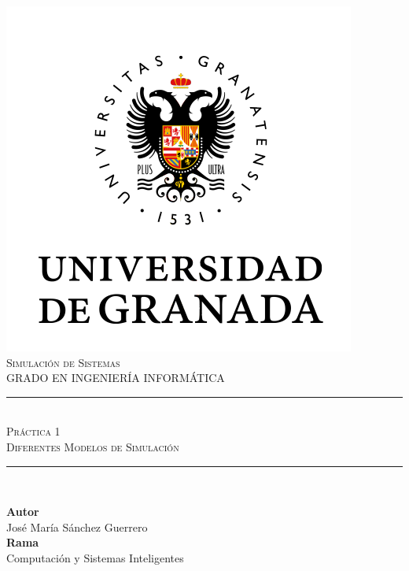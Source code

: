 \documentclass[11pt,a4paper]{report}
\newcommand{\asignatura}{Simulación de Sistemas}
\newcommand{\autor}{José María Sánchez Guerrero}
\newcommand{\titulo}{Práctica 1}
\newcommand{\subtitulo}{Diferentes Modelos de Simulación}
\begin{document}

\begin{titlepage}

\begin{minipage}{\textwidth}

\centering

\includegraphics[scale=0.5]{img/ugr.png}\\

\textsc{\Large \asignatura{}\\[0.2cm]}
\textsc{GRADO EN INGENIERÍA INFORMÁTICA}\\[1cm]

\noindent\rule[-1ex]{\textwidth}{1pt}\\[1.5ex]
\textsc{{\Huge \titulo\\[0.5ex]}}
\textsc{{\Large \subtitulo\\}}
\noindent\rule[-1ex]{\textwidth}{2pt}\\[3.5ex]

\end{minipage}

\vspace{0.5cm}

\begin{minipage}{\textwidth}

\centering

\textbf{Autor}\\ {\autor{}}\\[2.5ex]
\textbf{Rama}\\ {Computación y Sistemas Inteligentes}\\[2.5ex]
\vspace{0.3cm}


\end{minipage}
\end{titlepage}
\end{document}
